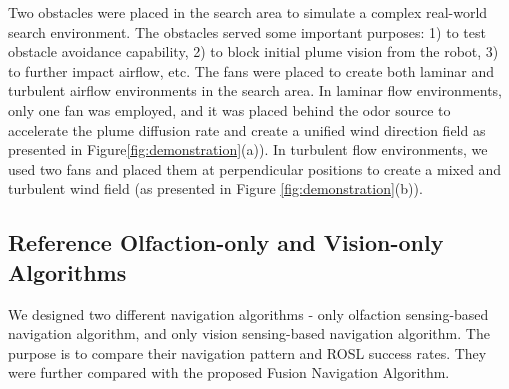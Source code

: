 Two obstacles were placed in the search area to simulate a complex real-world search environment. The obstacles served some important purposes: 1) to test obstacle avoidance capability, 2) to block initial plume vision from the robot, 3) to further impact airflow, etc. The fans were placed to create both laminar and turbulent airflow environments in the search area. In laminar flow environments, only one fan was employed, and it was placed behind the odor source to accelerate the plume diffusion rate and create a unified wind direction field as presented in Figure\ref{fig:demonstration}{(a)}). In turbulent flow environments, we used two fans and placed them at perpendicular positions to create a mixed and turbulent wind field (as presented in Figure \ref{fig:demonstration}{(b)}).


\subsection{Reference Olfaction-only and Vision-only Algorithms}\label{subsec:fusionReferenceAlgorithms}

We designed two different navigation algorithms - only olfaction sensing-based navigation algorithm, and only vision sensing-based navigation algorithm. The purpose is to compare their navigation pattern and ROSL success rates. They were further compared with the proposed Fusion Navigation Algorithm.

